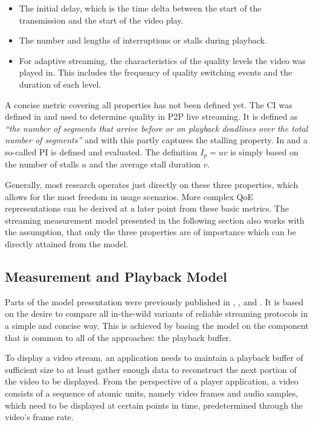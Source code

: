 \begin{itemize}
	\item The initial delay, which is the time delta between the start of the transmission and the start of the video play.

	\item The number and lengths of interruptions or stalls during playback.

	\item For adaptive streaming, the characteristics of the quality levels the video was played in. This includes the frequency of quality switching events and the duration of each level.
\end{itemize}

A concise metric covering all properties has not been defined yet. The \gls{CI} was defined in \cite{1498486} and used to determine quality in \gls{P2P} live streaming. It is defined as \textit{\enquote{the number of segments that arrive before or on playback deadlines over the total number of segments}} and with this partly captures the stalling property. In \cite{5634160} and \cite{DBLP:journals/corr/SeyedebrahimiBP13} a so-called \gls{PI} is defined and evaluated. The definition $I_p = uv$ is simply based on the number of stalls $u$ and the average stall duration $v$. 

Generally, most research operates just directly on these three properties, which allows for the most freedom in usage scenarios. More complex \gls{QoE} representations can be derived at a later point from these basic metrics. The streaming measurement model presented in the following section also works with the assumption, that only the three properties are of importance which can be directly attained from the model. 


\subsection{Measurement and Playback Model}
\label{c3:sec:model}

Parts of the model presentation were previously published in \cite{cs3518}, \cite{metzger2011delivery}, and \cite{6229739}. It is based on the desire to compare all in-the-wild variants of reliable streaming protocols in a simple and concise way. This is achieved by basing the model on the component that is common to all of the approaches: the playback buffer.

To display a video stream, an application needs to maintain a playback buffer of sufficient size to at least gather enough data to reconstruct the next portion of the video to be displayed. From the perspective of a player application, a video consists of a sequence of atomic units, namely video frames and audio samples, which need to be displayed at certain points in time, predetermined through the video's frame rate. 

